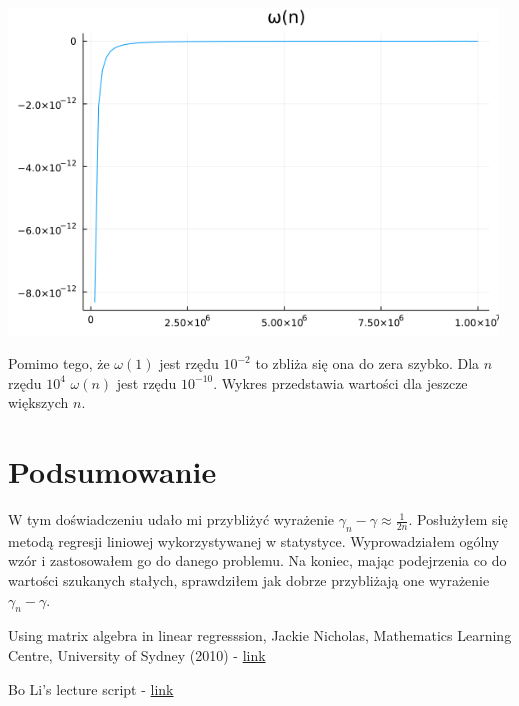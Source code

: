 \documentclass[a4paper,12pt]{article}
\begin{document}
\includegraphics[width=13cm]{wyk.png}

\noindent Pomimo tego, że $\omega(1)$ jest rzędu $10^{-2}$ to zbliża się ona do zera szybko. Dla $n$ rzędu $10^4$ $\omega(n)$ jest rzędu $10^{-10}$. Wykres przedstawia wartości dla jeszcze większych $n$.


\section{Podsumowanie}

W tym doświadczeniu udało mi przybliżyć wyrażenie $\gamma_n - \gamma \approx \frac{1}{2n}$. Posłużyłem się metodą regresji liniowej wykorzystywanej w statystyce. Wyprowadziałem ogólny wzór i zastosowałem go do danego problemu. Na koniec, mając podejrzenia co do wartości szukanych stałych, sprawdziłem jak dobrze przybliżają one wyrażenie $\gamma_n - \gamma$.  


\begin{thebibliography}{9}
Using matrix algebra in linear regresssion, Jackie Nicholas, Mathematics Learning Centre, University of Sydney (2010) -  \href{https://www.sydney.edu.au/content/dam/students/documents/mathematics-learning-centre/using-matrix-algebra-in-linear-regression.pdf}{link}

Bo Li's lecture script -  \href{https://www.stat.purdue.edu/~boli/stat512/lectures/topic3.pdf}{link}
\end{thebibliography}
\end{document}
